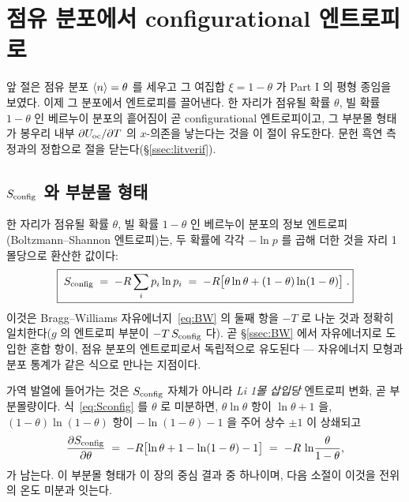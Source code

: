 \section{점유 분포에서 configurational 엔트로피로}\label{sec:config}

앞 절은 점유 분포 $\langle n\rangle=\theta$ 를 세우고 그 여집합 $\xi=1-\theta$ 가 Part I 의 평형 종임을 보였다. 이제
그 분포에서 엔트로피를 끌어낸다. 한 자리가 점유될 확률 $\theta$, 빌 확률 $1-\theta$ 인 베르누이 분포의
흩어짐이 곧 configurational 엔트로피이고, 그 부분몰 형태가 봉우리 내부 $\partial U_{\mathrm{oc}}/\partial T$ 의 $x$-의존을
낳는다는 것을 이 절이 유도한다. 문헌 흑연 측정과의 정합으로 절을 닫는다(\S\ref{ssec:litverif}).

\subsection{$S_{\mathrm{config}}$ 와 부분몰 형태}\label{ssec:sconfig}
한 자리가 점유될 확률 $\theta$, 빌 확률 $1-\theta$ 인 베르누이 분포의 정보 엔트로피(Boltzmann--Shannon
엔트로피)는, 두 확률에 각각 $-\ln p$ 를 곱해 더한 것을 자리 1몰당으로 환산한 값이다:
\begin{equation}
\boxed{\;S_{\mathrm{config}} \;=\; -R\sum_i p_i\ln p_i
\;=\; -R\bigl[\theta\ln\theta + (1-\theta)\ln(1-\theta)\bigr]\;.}
\label{eq:Sconfig}
\end{equation}
이것은 Bragg--Williams 자유에너지~\eqref{eq:BW} 의 둘째 항을 $-T$ 로 나눈 것과 정확히 일치한다($g$ 의 엔트로피
부분이 $-T\,S_{\mathrm{config}}$ 다). 곧 \S\ref{ssec:BW} 에서 자유에너지로 도입한 혼합 항이, 점유 분포의 엔트로피로서
독립적으로 유도된다 --- 자유에너지 모형과 분포 통계가 같은 식으로 만나는 지점이다.

가역 발열에 들어가는 것은 $S_{\mathrm{config}}$ 자체가 아니라 \emph{Li 1몰 삽입당} 엔트로피 변화, 곧 부분몰량이다.
식~\eqref{eq:Sconfig} 를 $\theta$ 로 미분하면, $\theta\ln\theta$ 항이 $\ln\theta+1$ 을, $(1-\theta)\ln(1-\theta)$
항이 $-\ln(1-\theta)-1$ 을 주어 상수 $\pm1$ 이 상쇄되고
\begin{equation}
\frac{\partial S_{\mathrm{config}}}{\partial\theta}
\;=\; -R\bigl[\ln\theta + 1 - \ln(1-\theta) - 1\bigr]
\;=\; -R\,\ln\!\frac{\theta}{1-\theta},
\label{eq:dSconfig}
\end{equation}
가 남는다. 이 부분몰 형태가 이 장의 중심 결과 중 하나이며, 다음 소절이 이것을 전위의 온도 미분과 잇는다.

